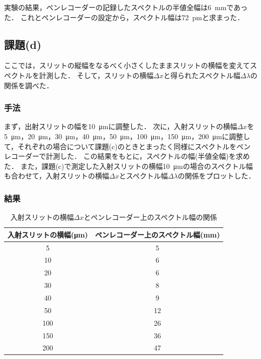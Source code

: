 \documentclass[titlepage]{jsarticle}
\begin{document}
実験の結果，ペンレコーダーの記録したスペクトルの半値全幅は\SI{6}{\mm}であった．
これとペンレコーダーの設定から，スペクトル幅は\SI{72}{\pm}と求まった．

\subsection{課題(d)}
ここでは，スリットの縦幅をなるべく小さくしたままスリットの横幅を変えてスペクトルを計測した．
そして，スリットの横幅$\Delta x$と得られたスペクトル幅$\Delta \lambda$の関係を調べた．

\subsubsection{手法}
まず，出射スリットの幅を\SI{10}{\um}に調整した．
次に，入射スリットの横幅$\Delta x$を\SI{5}{\um}，\SI{20}{\um}，\SI{30}{\um}，\SI{40}{\um}，\SI{50}{\um}，\SI{100}{\um}，\SI{150}{\um}，\SI{200}{\um}に調整して，それぞれの場合について課題(c)のときとまったく同様にスペクトルをペンレコーダーで計測した．
この結果をもとに，スペクトルの幅(半値全幅)を求めた．
また，課題(c)で測定した入射スリットの横幅\SI{10}{\um}の場合のスペクトル幅も合わせて，入射スリットの横幅$\Delta x$とスペクトル幅$\Delta\lambda$の関係をプロットした．

\subsubsection{結果}

\begin{table}[htbp]
  \centering
  \caption{入射スリットの横幅$\Delta x$とペンレコーダー上のスペクトル幅の関係}
  \label{tab:spectrum_width}
  \begin{tabular}{c|c}
    入射スリットの横幅(\si{\um}) & ペンレコーダー上のスペクトル幅(\si{\mm})\\
    \hline\hline
    5 & 5\\
    10 & 6\\
    20 & 6\\
    30 & 8\\
    40 & 9\\
    50 & 12\\
    100 & 26\\
    150 & 36\\
    200 & 47\\
    \hline
  \end{tabular}
\end{table}
\end{document}
